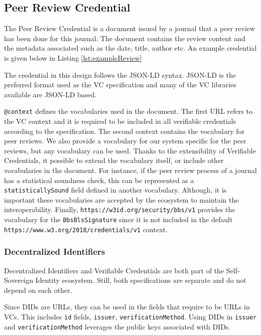 \subsection{Peer Review Credential}

The Peer Review Credential is a document issued by a journal that a peer review has been done for this journal. The document contains the review content and the metadata associated such as the date, title, author etc. An example credential is given below in Listing \ref{lst:exampleReview}



The credential in this design follows the JSON-LD syntax. JSON-LD is the preferred format used as the VC specification and many of the VC libraries available are JSON-LD based. 

\lstinline{@context} defines the vocabularies used in the document. The first URL refers to the VC context and it is required to be included in all verifiable credentials according to the specification. The second context contains the vocabulary for peer reviews. We also provide a vocabulary for our system specific for the peer reviews, but any vocabulary can be used. Thanks to the extensibility of Verifiable Credentials, it possible to extend the vocabulary itself, or include other vocabularies in the document. For instance, if the peer review process of a journal has a statistical soundness check, this can be represented as a \lstinline{statisticallySound} field defined in another vocabulary. Although, it is important these vocabularies are accepted by the ecosystem to maintain the interoperability. Finally, \lstinline{https://w3id.org/security/bbs/v1} provides the vocabulary for the \lstinline{BbsBlsSignature} since it is not included in the default \lstinline{https://www.w3.org/2018/credentials/v1} context.

\subsubsection{Decentralized Identifiers}

Decentralized Identifiers and Verifiable Credentials are both part of the Self-Sovereign Identity ecosystem. Still, both specifications are separate and do not depend on each other. 

Since DIDs are URLs, they can be used in the fields that require to be URLs in VCs. This includes \lstinline{id} fields, \lstinline{issuer}, \lstinline{verificationMethod}. Using DIDs in \lstinline{issuer} and \lstinline{verificationMethod} leverages the public keys associated with DIDs.


